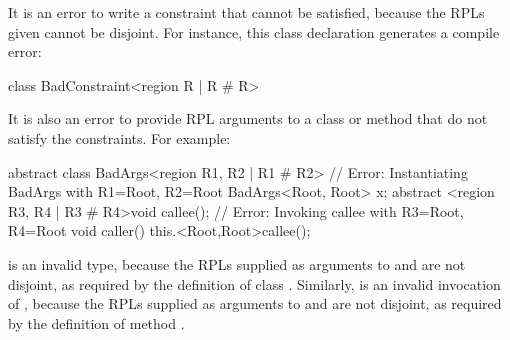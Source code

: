 It is an error to write a constraint that cannot be satisfied, because
the RPLs given cannot be disjoint.  For instance, this class
declaration generates a compile error:
%
\begin{dpjlisting}
class BadConstraint<region R | R # R> {}
\end{dpjlisting}

It is also an error to provide RPL arguments to a class or method that
do not satisfy the constraints.  For example:
%
\begin{dpjlisting}
abstract class BadArgs<region R1, R2 | R1 # R2> {
  // Error:  Instantiating BadArgs with R1=Root, R2=Root
  BadArgs<Root, Root> x;
  abstract <region R3, R4 | R3 # R4>void callee();
  // Error:  Invoking callee with R3=Root, R4=Root
  void caller() {
    this.<Root,Root>callee();
  }
}
\end{dpjlisting}
%
 is an invalid type, because the RPLs
supplied as arguments to  and  are not disjoint, as
required by the definition of class .  Similarly,
 is an invalid invocation of
, because the RPLs supplied as arguments to  and
 are not disjoint, as required by the definition of method
.

